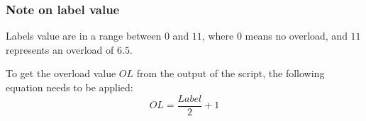 \subsubsection{Note on label value}
Labels value are in a range between $0$ and $11$, where $0$ means no overload, and $11$ represents an overload of $6.5$.

To get the overload value $OL$ from the output of the script, the following equation needs to be applied:
\begin{equation}
    OL = \frac{Label}{2}+1
\end{equation}